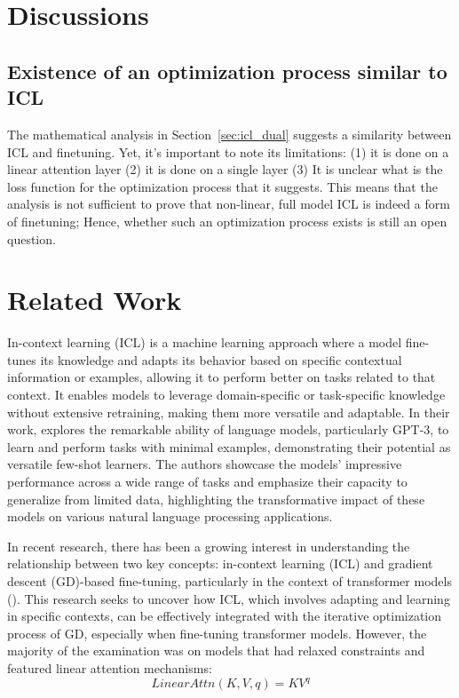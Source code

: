 \documentclass[11pt]{article}
\begin{document}
\section{Discussions}
\subsection{Existence of an optimization process similar to ICL}
The mathematical analysis in Section~\ref{sec:icl_dual} suggests a similarity between ICL and finetuning.
Yet, it's important to note its limitations: (1) it is done on a linear attention layer (2) it is done on a single layer
(3) It is unclear what is the loss function for the optimization process that it suggests. 
This means that the analysis is not sufficient to prove that non-linear, full model ICL is indeed a form of finetuning; 
Hence, whether such an optimization process exists is still an open question.

\section{Related Work}
In-context learning (ICL) is a machine learning approach where a model fine-tunes its knowledge and adapts its behavior based on specific contextual information or examples, allowing it to perform better on tasks related to that context.
It enables models to leverage domain-specific or task-specific knowledge without extensive retraining, making them more versatile and adaptable.
In their work, \cite{NEURIPS2020_1457c0d6} explores the remarkable ability of language models, particularly GPT-3, to learn and perform tasks with minimal examples, demonstrating their potential as versatile few-shot learners.
The authors showcase the models' impressive performance across a wide range of tasks and emphasize their capacity to generalize from limited data, highlighting the transformative impact of these models on various natural language processing applications.

In recent research, there has been a growing interest in understanding the relationship between two key concepts: in-context learning (ICL) and gradient descent (GD)-based fine-tuning, particularly in the context of transformer models (\cite{pmlr-v202-von-oswald23a,2022arXiv221210559D}).
This research seeks to uncover how ICL, which involves adapting and learning in specific contexts, can be effectively integrated with the iterative optimization process of GD, especially when fine-tuning transformer models.
However, the majority of the examination was on models that had relaxed constraints and featured linear attention mechanisms:
\begin{equation}
	LinearAttn(K,V,q)=KV^q
\end{equation}
\end{document}
